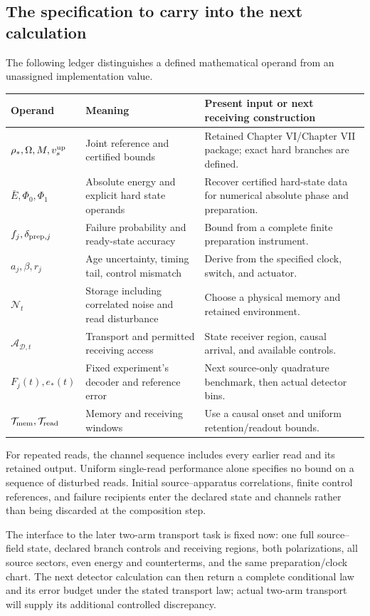 \subsection{The specification to carry into the next calculation}
The following ledger distinguishes a defined mathematical operand from an
unassigned implementation value.
\begin{center}\small
\begin{tabularx}{\linewidth}{@{}l >{\raggedright\arraybackslash}X >{\raggedright\arraybackslash}X@{}}
\toprule
Operand & Meaning & Present input or next receiving construction\\
\midrule
$\rho_*,\Omega,M,v_s^{\rm up}$ & Joint reference and certified bounds
 & Retained Chapter VI/Chapter VII package; exact hard branches are defined.\\
$\bar E,\Phi_0,\Phi_1$ & Absolute energy and explicit hard state operands
 & Recover certified hard-state data for numerical absolute phase and preparation.\\
$f_j,\delta_{{\rm prep},j}$ & Failure probability and ready-state accuracy
 & Bound from a complete finite preparation instrument.\\
$a_j,\beta,r_j$ & Age uncertainty, timing tail, control mismatch
 & Derive from the specified clock, switch, and actuator.\\
$\mathcal N_t$ & Storage including correlated noise and read disturbance
 & Choose a physical memory and retained environment.\\
$\mathcal A_{\mathcal D,t}$ & Transport and permitted receiving access
 & State receiver region, causal arrival, and available controls.\\
$F_j(t),e_*(t)$ & Fixed experiment's decoder and reference error
 & Next source-only quadrature benchmark, then actual detector bins.\\
$\mathcal T_{\rm mem},\mathcal T_{\rm read}$ & Memory and receiving windows
 & Use a causal onset and uniform retention/readout bounds.\\
\bottomrule
\end{tabularx}
\end{center}

For repeated reads, the channel sequence includes every earlier read and its
retained output. Uniform single-read performance alone specifies no bound
on a sequence of disturbed reads. Initial source--apparatus correlations,
finite control references, and failure recipients enter the declared state
and channels rather than being discarded at the composition step.

The interface to the later two-arm transport task is fixed now: one full
source--field state, declared branch controls and receiving regions, both
polarizations, all source sectors, even energy and counterterms, and the
same preparation/clock chart. The next detector calculation can then return
a complete conditional law and its error budget under the stated transport
law; actual two-arm transport will supply its additional controlled
discrepancy.


